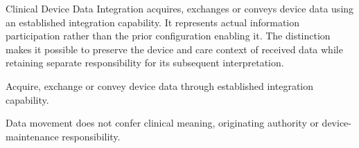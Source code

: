 Clinical Device Data Integration acquires, exchanges or conveys device data using an established integration capability. It represents actual information participation rather than the prior configuration enabling it. The distinction makes it possible to preserve the device and care context of received data while retaining separate responsibility for its subsequent interpretation.



Acquire, exchange or convey device data through established integration capability.



Data movement does not confer clinical meaning, originating authority or device-maintenance responsibility.


